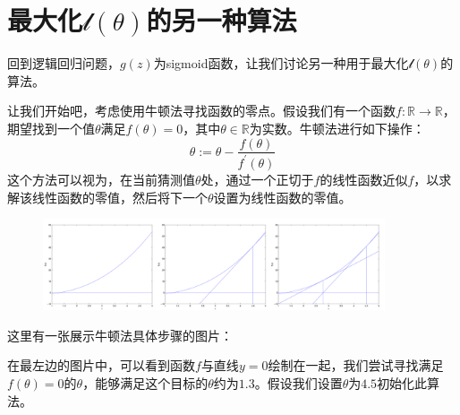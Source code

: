 \section{最大化$\mathcal{l}(\theta)$的另一种算法}

回到逻辑回归问题，$g(z)$为sigmoid函数，让我们讨论另一种用于最大化$\mathcal{l}(\theta)$的算法。

让我们开始吧，考虑使用牛顿法寻找函数的零点。假设我们有一个函数$f:\mathbb{R}\rightarrow\mathbb{R}$，期望找到一个值$\theta$满足$f(\theta)=0$，其中$\theta \in \mathbb{R}$为实数。牛顿法进行如下操作：
$$
  \theta := \theta - \frac{f(\theta)}{f^\prime(\theta)}
$$
这个方法可以视为，在当前猜测值$\theta$处，通过一个正切于$f$的线性函数近似$f$，以求解该线性函数的零值，然后将下一个$\theta$设置为线性函数的零值。

\begin{figure}
  \begin{center}
    \includegraphics[width=0.9\textwidth]{imgs/2.4_newton.jpg}
  \end{center}
\end{figure}

这里有一张展示牛顿法具体步骤的图片：

在最左边的图片中，可以看到函数$f$与直线$y=0$绘制在一起，我们尝试寻找满足$f(\theta)=0$的$\theta$，能够满足这个目标的$\theta$约为$1.3$。假设我们设置$\theta$为$4.5$初始化此算法。